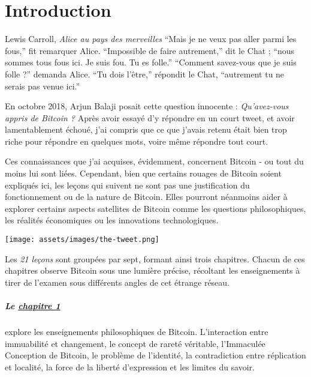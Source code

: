 \chapter*{Introduction}
\label{ch:introduction}

\begin{chapquote}{Lewis Carroll, \textit{Alice au pays des merveilles}}
\enquote{Mais je ne veux pas aller parmi les fous,} fit remarquer Alice.
\enquote{Impossible de faire autrement,} dit le Chat ; \enquote{nous sommes tous
fous ici. Je suis fou. Tu es folle.} \enquote{Comment savez-vous que je suis
folle ?} demanda Alice. \enquote{Tu dois l’être,} répondit le Chat,
\enquote{autrement tu ne serais pas venue ici.}
\end{chapquote}

En octobre 2018, Arjun Balaji posait cette question innocente :
\textit{Qu'avez-vous appris de Bitcoin ?} Après avoir essayé d'y répondre en un
court tweet, et avoir lamentablement échoué, j'ai compris que ce que j'avais
retenu était bien trop riche pour répondre en quelques mots, voire même répondre
tout court.

Ces connaissances que j'ai acquises, évidemment, concernent Bitcoin - ou tout du
moins lui sont liées. Cependant, bien que certains rouages de Bitcoin soient
expliqués ici, les leçons qui suivent ne sont pas une justification du
fonctionnement ou de la nature de Bitcoin. Elles pourront néanmoins aider à
explorer certains aspects satellites de Bitcoin comme les questions
philosophiques, les réalités économiques ou les innovations technologiques.

\begin{center}
  \texttt{[image: assets/images/the-tweet.png]}
\end{center}

Les \textit{21 leçons} sont groupées par sept, formant ainsi trois chapitres.
Chacun de ces chapitres observe Bitcoin sous une lumière précise, récoltant les
enseignements à tirer de l'examen sous différents angles de cet étrange réseau.

\paragraph{Le \hyperref[ch:philosophy]{chapitre 1}}{explore les enseignements
philosophiques de Bitcoin. L'interaction entre immuabilité et changement, le
concept de rareté véritable, l'Immaculée Conception de Bitcoin, le problème de
l'identité, la contradiction entre réplication et localité, la force de la
liberté d'expression et les limites du savoir.}

